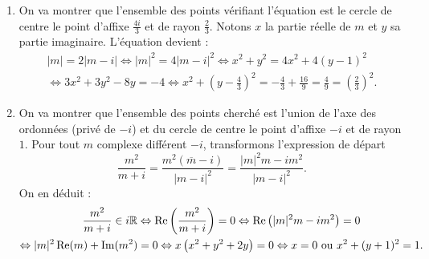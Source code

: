 \begin{enumerate}
 \item On va montrer que l'ensemble des points vérifiant l'équation est le cercle de centre le point d'affixe $\frac{4i}{3}$ et de rayon $ \frac{2}{3}$.\newline
 Notons $x$ la partie réelle de $m$ et $y$ sa partie imaginaire. L'équation devient :
\begin{multline*}
 |m|=2|m-i|\Leftrightarrow |m|^2=4|m-i|^2
\Leftrightarrow x^2+y^2 = 4x^2 + 4(y-1)^2 \\
\Leftrightarrow 3x^2 + 3y^2 -8y = -4 
\Leftrightarrow x^2 + (y-\frac{4}{3})^2 = -\frac{4}{3}+\frac{16}{9} = \frac{4}{9} = \left(\frac{2}{3} \right)^2 .
\end{multline*}
 \item On va montrer que l'ensemble des points cherché est l'union de l'axe des ordonnées (privé de $-i$) et du cercle de centre le point d'affixe $-i$ et de rayon $1$.\newline
Pour tout $m$ complexe différent $-i$, transformons l'expression de départ
\begin{displaymath}
 \frac{m^2}{m+i} = \frac{m^2(\overline{m}-i)}{|m-i|^2}=\frac{|m|^2m -im^2}{|m-i|^2}.
\end{displaymath}
On en déduit :
\begin{multline*}
 \frac{m^2}{m+i}\in i\mathbb{R} \Leftrightarrow \operatorname{Re}\left(\frac{m^2}{m+i}\right)=0
\Leftrightarrow \operatorname{Re}\left(|m|^2m -im^2 \right)=0 \\
\Leftrightarrow |m|^2\operatorname{Re}(m)+ \operatorname{Im}(m^2)=0
\Leftrightarrow x\left(x^2+y^2+2y \right)=0
\Leftrightarrow
x=0 \text{ ou } x^2 + (y+1)^2 = 1 .
\end{multline*}

\end{enumerate}
